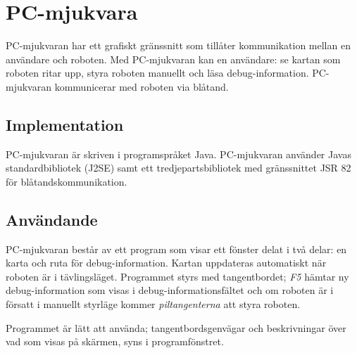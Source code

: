 \section{PC-mjukvara}

PC-mjukvaran har ett grafiskt gränssnitt som tillåter kommunikation mellan en
användare och roboten. Med PC-mjukvaran kan en användare: se kartan som roboten
ritar upp, styra roboten manuellt och läsa debug-information. PC-mjukvaran
kommunicerar med roboten via blåtand.

\subsection{Implementation}

PC-mjukvaran är skriven i programspråket Java. PC-mjukvaran använder Javas
standardbibliotek (J2SE) samt ett tredjepartsbibliotek med gränssnittet JSR 82
för blåtandskommunikation.

\subsection{Användande}

PC-mjukvaran består av ett program som visar ett fönster delat i två delar: en
karta och ruta för debug-information. Kartan uppdateras automatiskt när roboten
är i tävlingsläget. Programmet styrs med tangentbordet; \textit{F5} hämtar ny
debug-information som visas i debug-informationsfältet och om roboten är i
försatt i manuellt styrläge kommer \emph{piltangenterna} att styra roboten.

Programmet är lätt att använda; tangentbordsgenvägar och beskrivningar över vad
som visas på skärmen, syns i programfönstret.
